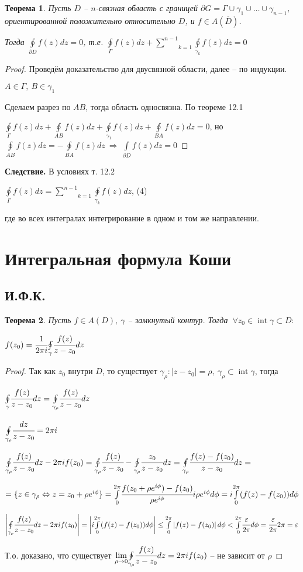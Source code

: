 \documentclass[final]{report}
\newcommand{\dd}{\partial}
\newcommand{\then}{\ \Rightarrow\ }
\newcommand{\mint}[2]{\underset{#1}{\overset{#2}{\int}}}
\newcommand{\moint}[1]{\underset{#1}{\oint}}
\newcommand{\msum}[2]{\underset{#1}{\overset{#2}{\sum}}}
\newcommand{\mlim}[1]{\underset{#1}{\lim}}
\newcommand{\LRA}{\Leftrightarrow}
\renewcommand{\bar}{\overline}
\newcommand{\Int}{\mathop{\mathrm{int}}\nolimits}
\newcommand{\g}{\gamma}
\newcommand{\G}{\Gamma}
\renewcommand{\f}{\phi}
\newcommand{\F}{\ \forall}
\newtheorem*{theor}{Теорема}
\theoremstyle{remark}
\begin{document}
\begin{theor}
Пусть $D$ -- $n$-связная область с границей $\dd G=\G\cup\g_1\cup\ldots\cup\g_{n-1}$, ориентированной положительно относительно $D$, и $f\in A(\bar{D})$. 

Тогда $\moint{\dd D}f(z)dz=0$, т.е. $\moint{\G}f(z)dz+\msum{k=1}{n-1}\moint{\g_k}f(z)dz=0$
\end{theor}
\begin{proof}
Проведём доказательство для двусвязной области, далее -- по индукции.

$A\in\G,\ B\in\g_1$

Сделаем разрез по $AB$, тогда область односвязна. По теореме 12.1

$\moint{\G}f(z)dz+\moint{AB}f(z)dz+\moint{\g_1}f(z)dz+\moint{BA}f(z)dz=0$, но $\moint{AB}f(z)dz=-\moint{BA}f(z)dz\then\mint{\dd D}{}f(z)dz=0$
\end{proof}

{\bfseries Следствие.}
В условиях т. 12.2

$\moint{\G}f(z)dz=\msum{k=1}{n-1}\moint{\g_k}f(z)dz$, (4)

где во всех интегралах интегрирование в одном и том же направлении.

\newpage

\section{Интегральная формула Коши}

\subsection{И.Ф.К.}

\begin{theor}
Пусть $f\in A(D),\ \g$ -- замкнутый контур. Тогда $\F z_0\in\Int\g\subset D:$

$f(z_0)=\cfrac{1}{2\pi i}\moint{\g}\cfrac{f(z)}{z-z_0}dz$
\end{theor}
\begin{proof}
Так как $z_0$ внутри $D$, то существует $\g_\rho\colon|z-z_0|=\rho,\ \g_\rho\subset\Int\g$, тогда

$\moint{\g}\cfrac{f(z)}{z-z_0}dz=\moint{\g_\rho}\cfrac{f(z)}{z-z_0}dz$

$\moint{\g_\rho}\cfrac{dz}{z-z_0}=2\pi i$

$\moint{\g_\rho}\cfrac{f(z)}{z-z_0}dz-2\pi if(z_0)=\moint{\g_\rho}\cfrac{f(z)}{z-z_0}-\moint{\g_\rho}\cfrac{z_0}{z-z_0}dz=\moint{\g_\rho}\cfrac{f(z)-f(z_0)}{z-z_0}dz=$

$=\{z\in\g_\rho \LRA z=z_0+\rho e^{i\f}\}=\mint{0}{2\pi}\cfrac{f(z_0+\rho e^{i\f})-f(z_0)}{\rho e^{i\f}}i\rho e^{i\f}d\f=i\mint{0}{2\pi}(f(z)-f(z_0))d\f$

$\left|\moint{\g_\rho}\cfrac{f(z)}{z-z_0}dz-2\pi if(z_0)\right|=\left|i\mint{0}{2\pi}(f(z)-f(z_0))d\f\right|\leq\mint{0}{2\pi}\left|f(z)-f(z_0)\right|d\f<\mint{0}{2\pi}\cfrac{\varepsilon}{2\pi}d\f=\cfrac{\varepsilon}{2\pi}2\pi=\varepsilon$

Т.о. доказано, что существует $\mlim{\rho\to0}\moint{\g_\rho}\cfrac{f(z)}{z-z_0}dz=2\pi if(z_0)$ -- не зависит от $\rho$
\end{proof}
\end{document}
